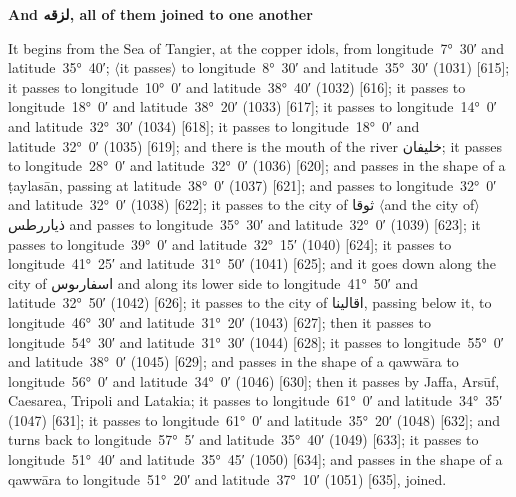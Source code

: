 \documentclass[11pt]{article}
\newcommand{\Pg}[1]{\marginpar{\footnotesize #1}}
\newcommand{\Ang}[1]{\ensuremath{#1}}
\begin{document}
\par\medskip\begin{center}\bfseries And \textarabic{لزقه}, all of them joined to one another\end{center}\par

It begins from the Sea of Tangier, at the copper idols, from longitude~7°~30′ and latitude~35°~40′; \Ang{\langle}it passes\Ang{\rangle} to longitude~8°~30′ and latitude~35°~30′ (1031) [615]; it passes to longitude~10°~0′ and latitude~38°~40′ (1032) [616]; it passes to longitude~18°~0′ and latitude~38°~20′ (1033) [617]; it passes to longitude~14°~0′ and latitude~32°~30′ (1034) [618]; it passes to longitude~18°~0′ and latitude~32°~0′ (1035) [619]; and there is the mouth of the river \textarabic{خليفان}; it passes to longitude~28°~0′ and latitude~32°~0′ (1036) [620]; and passes in the shape of a ṭaylasān, passing at latitude~38°~0′ (1037) [621]; and passes to longitude~32°~0′ and latitude~32°~0′ (1038) [622]\Pg{p. 70}; it passes to the city of \textarabic{ثوقا} \Ang{\langle}and the city of\Ang{\rangle} \textarabic{ذياررطس} and passes to longitude~35°~30′ and latitude~32°~0′ (1039) [623]; it passes to longitude~39°~0′ and latitude~32°~15′ (1040) [624]; it passes to longitude~41°~25′ and latitude~31°~50′ (1041) [625]; and it goes down along the city of \textarabic{اسفارٮوس} and along its lower side to longitude~41°~50′ and latitude~32°~50′ (1042) [626]; it passes to the city of \textarabic{اقالينا}, passing below it, to longitude~46°~30′ and latitude~31°~20′ (1043) [627]; then it passes to longitude~54°~30′ and latitude~31°~30′ (1044) [628]; it passes to longitude~55°~0′ and latitude~38°~0′ (1045) [629]; and passes in the shape of a qawwāra to longitude~56°~0′ and latitude~34°~0′ (1046) [630]; then it passes by Jaffa, Arsūf, Caesarea, Tripoli and Latakia; it passes to longitude~61°~0′ and latitude~34°~35′ (1047) [631]; it passes to longitude~61°~0′ and latitude~35°~20′ (1048) [632]; and turns back to longitude~57°~5′ and latitude~35°~40′ (1049) [633]; it passes to longitude~51°~40′ and latitude~35°~45′ (1050) [634]; and passes in the shape of a qawwāra to longitude~51°~20′ and latitude~37°~10′ (1051) [635], joined.
\end{document}
